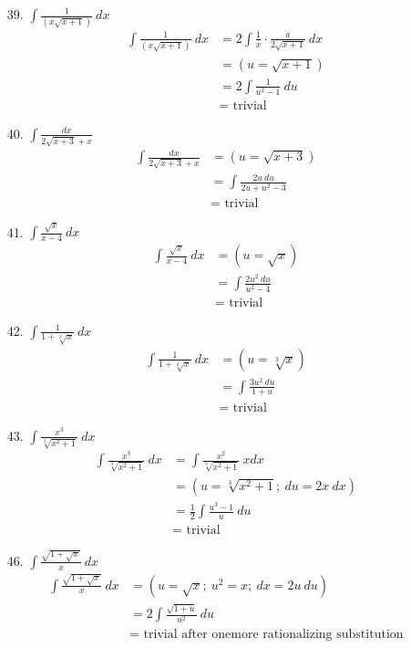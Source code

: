 \documentclass{article}
\begin{document}
\begin{enumerate}
\item[39.] $\displaystyle\int\frac{1}{(x\sqrt{x+1})}\ dx$
\begin{align*}
\int\frac{1}{(x\sqrt{x+1})}\ dx&=2\int\frac{1}{x}\cdot\frac{a}{2\sqrt{x+1}}\ dx\\
&=(u=\sqrt{x+1})\\
&=2\int\frac{1}{u^2-1}\ du\\
&=\mbox{ trivial}
\end{align*}
\item[40.] $\displaystyle\int\frac{dx}{2\sqrt{x+3}+x}$
\begin{align*}
\int\frac{dx}{2\sqrt{x+3}+x}&=(u=\sqrt{x+3})\\
&=\int\frac{2u\ du}{2u+u^2-3}\\
&=\mbox{ trivial}
\end{align*}
\item[41.] $\displaystyle\int\frac{\sqrt{x}}{x-4}\ dx$
\begin{align*}
\int\frac{\sqrt{x}}{x-4}\ dx&=(u=\sqrt{x})\\
&=\int\frac{2u^2\ du}{u^2-4}\\
&=\mbox{ trivial}
\end{align*}
\item[42.] $\displaystyle\int\frac{1}{1+\sqrt[3]{x}}\ dx$
\begin{align*}
\int\frac{1}{1+\sqrt[3]{x}}\ dx&=(u=\sqrt[3]{x})\\
&=\int\frac{3u^2\ du}{1+u}\\
&=\mbox{ trivial}
\end{align*}
\item[43.] $\displaystyle\int\frac{x^3}{\sqrt[3]{x^2+1}}\ dx$
\begin{align*}
\int\frac{x^3}{\sqrt[3]{x^2+1}}\ dx&=\int\frac{x^2}{\sqrt[3]{x^2+1}}\ xdx\\
&=(u=\sqrt[3]{x^2+1};\ du=2x\ dx)\\
&=\frac{1}{2}\int\frac{u^3-1}{u}\ du\\
&=\mbox{ trivial}
\end{align*}
\item[46.] $\displaystyle\int\frac{\sqrt{1+\sqrt{x}}}{x}\ dx$
\begin{align*}
\int\frac{\sqrt{1+\sqrt{x}}}{x}\ dx&=(u=\sqrt{x};\ u^2=x;\ dx=2u\ du)\\
&=2\int\frac{\sqrt{1+u}}{u^2}\ du\\
&=\mbox{ trivial after onemore rationalizing substitution}
\end{align*}
\end{enumerate}
\end{document}
